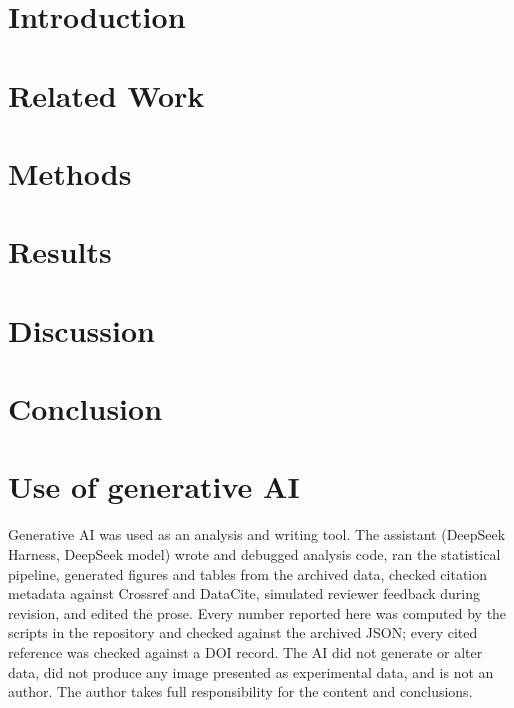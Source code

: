 \documentclass[11pt,a4paper,twocolumn]{article}
\begin{document}
\section{Introduction}


\section{Related Work}


\section{Methods}


\section{Results}


\section{Discussion}


\section{Conclusion}


\section*{Use of generative AI}
Generative AI was used as an analysis and writing tool. The assistant (DeepSeek Harness,
DeepSeek model) wrote and debugged analysis code, ran the statistical pipeline, generated
figures and tables from the archived data, checked citation metadata against Crossref and
DataCite, simulated reviewer feedback during revision, and edited the prose. Every number
reported here was computed by the scripts in the repository and checked against the
archived JSON; every cited reference was checked against a DOI record. The AI did not
generate or alter data, did not produce any image presented as experimental data, and is
not an author. The author takes full responsibility for the content and conclusions.
\end{document}
